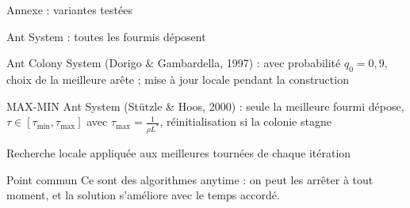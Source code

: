 \documentclass[aspectratio=169,11pt]{beamer}
\begin{document}
\begin{frame}{Annexe : variantes testées}
  \begin{description}
    \item[AS] Ant System : toutes les fourmis déposent
    \item[ACS] Ant Colony System (Dorigo \& Gambardella, 1997) : avec probabilité $q_0 = 0{,}9$,
               choix de la meilleure arête ; mise à jour locale pendant la construction
    \item[MMAS] MAX-MIN Ant System (Stützle \& Hoos, 2000) : seule la meilleure fourmi dépose,
                $\tau \in [\tau_{\min}, \tau_{\max}]$ avec $\tau_{\max} = \frac{1}{\rho L^{*}}$,
                réinitialisation si la colonie stagne
    \item[+ 2-opt] Recherche locale appliquée aux meilleures tournées de chaque itération
  \end{description}
  \vspace{0.5em}
  \begin{block}{Point commun}
    Ce sont des algorithmes \alert{anytime} : on peut les arrêter à tout moment, et la
    solution s'améliore avec le temps accordé.
  \end{block}
\end{frame}
\end{document}
